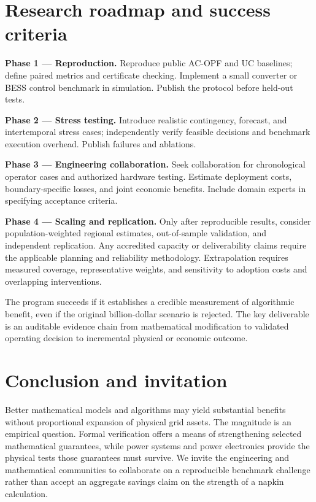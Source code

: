 \documentclass[11pt,letterpaper]{article}
\begin{document}
\section{Research roadmap and success criteria}
\textbf{Phase 1 --- Reproduction.} Reproduce public AC-OPF and UC baselines; define paired metrics and certificate checking. Implement a small converter or BESS control benchmark in simulation. Publish the protocol before held-out tests.

\textbf{Phase 2 --- Stress testing.} Introduce realistic contingency, forecast, and intertemporal stress cases; independently verify feasible decisions and benchmark execution overhead. Publish failures and ablations.

\textbf{Phase 3 --- Engineering collaboration.} Seek collaboration for chronological operator cases and authorized hardware testing. Estimate deployment costs, boundary-specific losses, and joint economic benefits. Include domain experts in specifying acceptance criteria.

\textbf{Phase 4 --- Scaling and replication.} Only after reproducible results, consider population-weighted regional estimates, out-of-sample validation, and independent replication. Any accredited capacity or deliverability claims require the applicable planning and reliability methodology. Extrapolation requires measured coverage, representative weights, and sensitivity to adoption costs and overlapping interventions.

The program succeeds if it establishes a credible measurement of algorithmic benefit, even if the original billion-dollar scenario is rejected. The key deliverable is an auditable evidence chain from mathematical modification to validated operating decision to incremental physical or economic outcome.

\section{Conclusion and invitation}
Better mathematical models and algorithms may yield substantial benefits without proportional expansion of physical grid assets. The magnitude is an empirical question. Formal verification offers a means of strengthening selected mathematical guarantees, while power systems and power electronics provide the physical tests those guarantees must survive. We invite the engineering and mathematical communities to collaborate on a reproducible benchmark challenge rather than accept an aggregate savings claim on the strength of a napkin calculation.
\end{document}
